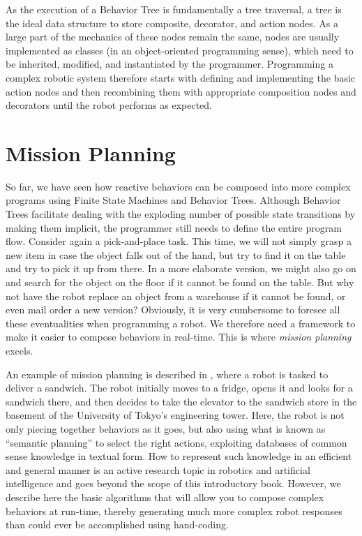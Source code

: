 As the execution of a Behavior Tree is fundamentally a tree traversal, a tree is the ideal data structure to store composite, decorator, and action nodes. As a large part of the mechanics of these nodes remain the same, nodes are usually implemented as classes (in an object-oriented programming sense), which need to be inherited, modified, and instantiated by the programmer. Programming a complex robotic system therefore starts with defining and implementing the basic action nodes and then recombining them with appropriate composition nodes and decorators until the robot performs as expected.

\section{Mission Planning}\label{sec:strips}

So far, we have seen how reactive behaviors can be composed into more complex programs using Finite State Machines and Behavior Trees. Although Behavior Trees facilitate dealing with the exploding number of possible state transitions by making them implicit, the programmer still needs to define the entire program flow. Consider again a pick-and-place task. This time, we will not simply grasp a new item in case the object falls out of the hand, but try to find it on the table and try to pick it up from there. In a more elaborate version, we might also go on and search for the object on the floor if it cannot be found on the table. But why not have the robot replace an object from a warehouse if it cannot be found, or even mail order a new version? Obviously, it is very cumbersome to foresee all these eventualities when programming a robot. We therefore need a framework to make it easier to compose behaviors in real-time. This is where \textsl{mission planning} excels.

An example of mission planning is described in \cite{saito2011semantic}, where a robot is tasked to deliver a sandwich. The robot initially moves to a fridge, opens it and looks for a sandwich there, and then decides to take the elevator to the sandwich store in the basement of the University of Tokyo's engineering tower. Here, the robot is not only piecing together behaviors as it goes, but also using what is known as ``semantic planning'' to select the right actions, exploiting databases of common sense knowledge in textual form. How to represent such knowledge in an efficient and general manner is an active research topic in robotics and artificial intelligence and goes beyond the scope of this introductory book. However, we describe here the basic algorithms that will allow you to compose complex behaviors at run-time, thereby generating much more complex robot responses than could ever be accomplished using hand-coding.

